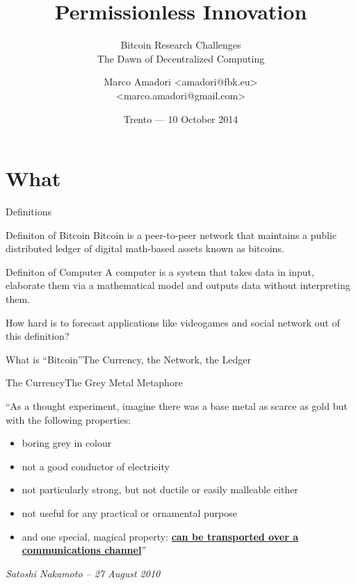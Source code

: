 \documentclass[english,compress]{beamer}
\title[Bitcoin Research Challenges]{Permissionless Innovation}
\subtitle{Bitcoin Research Challenges \\ The Dawn of Decentralized Computing}
\author[Marco Amadori]{Marco Amadori <amadori@fbk.eu> \\ <marco.amadori@gmail.com>}
\institute{Fondazione Bruno Kessler --- \url{https://www.fbk.eu}}
\date{\scriptsize Trento --- \vspace{.10cm}10 October 2014}
\newcommand{\powemph}[1]{\textbf{\underline{#1}}}
\begin{document}
\begin{frame}[plain]
  \titlepage
  \begin{center}%
    \hspace{1cm}%
    \end{center}%
\end{frame}


\section{What}

\begin{frame}[<+->]{Definitions}

\begin{exampleblock}{Definiton of Bitcoin}
Bitcoin is a peer-to-peer network
that maintains a public distributed ledger of 
digital math-based assets known as bitcoins.
\end{exampleblock}

\begin{exampleblock}{Definiton of Computer}
A computer is a system that takes data in input, elaborate them via a mathematical model and outputs data without interpreting them.
\end{exampleblock}

\onslide<+-> How hard is to forecast applications like videogames and social network out of this definition?


\end{frame}

\begin{frame}{What is ``Bitcoin''}{The Currency, the Network, the Ledger}
\begin{center}
\end{center}
\end{frame}

\begin{frame}{The Currency}{The Grey Metal Metaphore}

``As a thought experiment, imagine there was a base metal as scarce as gold but with the following properties:

\begin{itemize}
 \item boring grey in colour
 \item not a good conductor of electricity
 \item not particularly strong, but not ductile or easily malleable either
 \item not useful for any practical or ornamental purpose
 \item and one special, magical property: \powemph{can be transported over a communications channel}''
\end{itemize}

\em{Satoshi Nakamoto -- 27 August 2010}
\end{frame}
\end{document}
